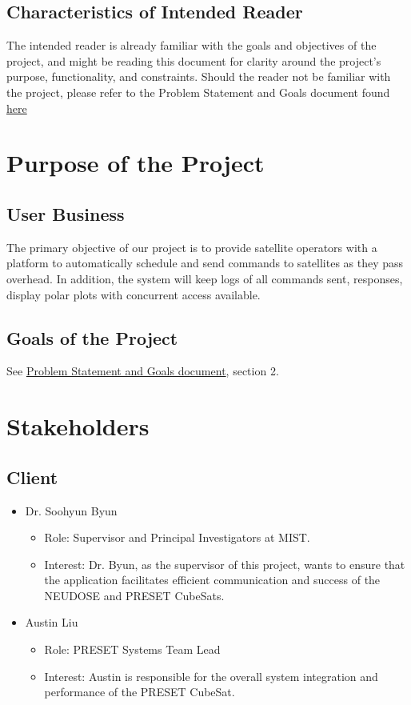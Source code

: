 \documentclass[12pt]{article}
\begin{document}
\subsection{Characteristics of Intended Reader}
The intended reader is already familiar with the goals and objectives of the project, and might be reading this document for clarity around the project’s purpose, functionality, and constraints. Should the reader not be familiar with the project, please refer to the Problem Statement and Goals document found \href{https://github.com/RishiVaya/Lower_Earth_Orbiters/blob/main/docs/ProblemStatementAndGoals/ProblemStatement.pdf}{here} 

\section{Purpose of the Project}
\subsection{User Business}
The primary objective of our project is to provide satellite operators with a platform to automatically schedule and send commands to satellites as they pass overhead. In addition, the system will keep logs of all commands sent, responses, display polar plots with concurrent access available. 
\subsection{Goals of the Project}
See \href{https://github.com/RishiVaya/Lower_Earth_Orbiters/blob/main/docs/ProblemStatementAndGoals/ProblemStatement.pdf}{ Problem Statement and Goals document}, section 2.
\section{Stakeholders}
\subsection{Client}
\begin{itemize}
    \item Dr. Soohyun Byun
    \begin{itemize}
        \item Role: Supervisor and Principal Investigators at MIST.
        \item Interest: Dr. Byun, as the supervisor of this project, wants to ensure that the application facilitates efficient communication and success of the NEUDOSE and PRESET CubeSats.

        
    \end{itemize}

    \item Austin Liu
    \begin{itemize}
        \item Role: PRESET Systems Team Lead
        \item Interest: Austin is responsible for the overall system integration and performance of the PRESET CubeSat.

    \end{itemize}
\end{itemize}
\end{document}
